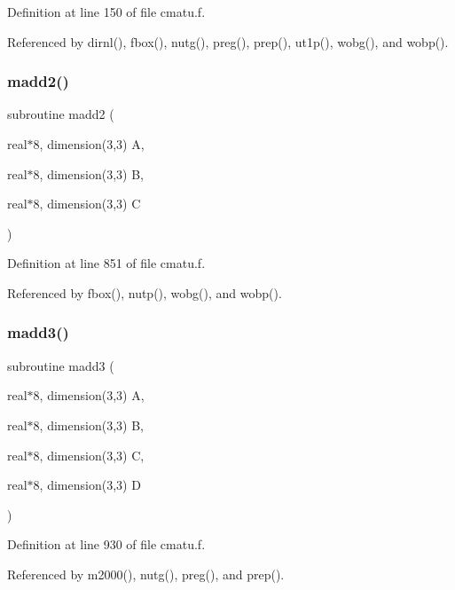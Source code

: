 Definition at line 150 of file cmatu.\+f.



Referenced by dirnl(), fbox(), nutg(), preg(), prep(), ut1p(), wobg(), and wobp().

\mbox{\label{cmatu_8f_a263077adffea85cb61d29e749c1fdad4}} 
\subsubsection{\texorpdfstring{madd2()}{madd2()}}
{\footnotesize\ttfamily subroutine madd2 (\begin{DoxyParamCaption}\item[{real$\ast$8, dimension(3,3)}]{A,  }\item[{real$\ast$8, dimension(3,3)}]{B,  }\item[{real$\ast$8, dimension(3,3)}]{C }\end{DoxyParamCaption})}



Definition at line 851 of file cmatu.\+f.



Referenced by fbox(), nutp(), wobg(), and wobp().

\mbox{\label{cmatu_8f_afe0b8cd203c04f0a1dc8d555a995432d}} 
\subsubsection{\texorpdfstring{madd3()}{madd3()}}
{\footnotesize\ttfamily subroutine madd3 (\begin{DoxyParamCaption}\item[{real$\ast$8, dimension(3,3)}]{A,  }\item[{real$\ast$8, dimension(3,3)}]{B,  }\item[{real$\ast$8, dimension(3,3)}]{C,  }\item[{real$\ast$8, dimension(3,3)}]{D }\end{DoxyParamCaption})}



Definition at line 930 of file cmatu.\+f.



Referenced by m2000(), nutg(), preg(), and prep().

\mbox{\label{cmatu_8f_aef2926b4c123f315cc08882e8dad33c4}} 
